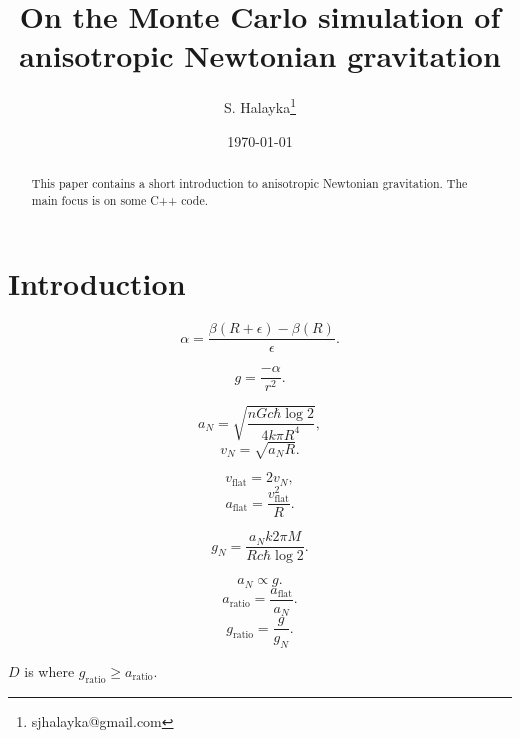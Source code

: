 \documentclass[12pt]{article}
\title{On the Monte Carlo simulation of anisotropic Newtonian gravitation}
\author{S. Halayka\footnote{sjhalayka@gmail.com}}
\date{\today\;\currenttime}
\begin{document}
 
\maketitle

\begin{abstract}
This paper contains a short introduction to anisotropic Newtonian gravitation.
The main focus is on some C++ code.
\end{abstract}



\section{Introduction}

\begin{equation}
\alpha = \frac{\beta(R + \epsilon) - \beta(R)}{\epsilon}.
\end{equation}

\begin{equation}
g = \frac{-\alpha}{r^2}. 
\end{equation}

\begin{equation}
a_N = \sqrt{\frac{n G c \hbar \log 2}{4 k \pi R^4}},
\end{equation}
\begin{equation}
v_N = \sqrt{a_N R}.
\end{equation}

\begin{equation}
v_{\textrm{flat}} = 2 v_N,
\end{equation}
\begin{equation}
a_{\textrm{flat}} = \frac{v_{\textrm{flat}}^2}{R}.
\end{equation}

\begin{equation}
g_N = \frac{a_N k 2 \pi M}{R c \hbar \log 2}. 
\end{equation}

\begin{equation}
a_N \propto g.
\end{equation}
\begin{equation}
a_{\textrm{ratio}} = \frac{a_{\textrm{flat}}}{a_N}. 
\end{equation}
\begin{equation}
g_{\textrm{ratio}} = \frac{g}{g_N}. 
\end{equation}

$D$ is where $g_{\textrm{ratio}} \geq a_{\textrm{ratio}}$.
\end{document}
